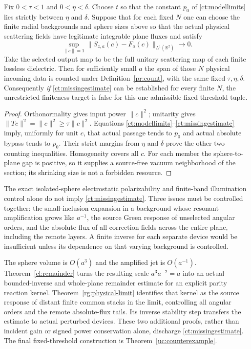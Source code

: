 \begin{proposition}
\label{ct:completion}
Fix $0<\tau<1$ and $0<\eta<\delta$. Choose $t$ so that the constant
$p_0$ of \eqref{ct:modellimits} lies strictly between $\eta$ and
$\delta$. Suppose that for each fixed $N$ one can choose the finite
radial backgrounds and sphere sizes above so that the actual
physical scattering fields have legitimate integrable plane fluxes
and satisfy
\begin{equation}\label{ct:missingestimate}
 \sup_{\|c\|=1}
 \|S_{z,a}(c)-F_a(c)\|_{L^1(\mathbb R^2)}\longrightarrow0.
\end{equation}
Take the selected output map to be the full unitary scattering map
of each finite lossless dielectric. Then for sufficiently small $a$
the span of those $N$ physical incoming data is counted under
Definition~\ref{pr:count}, with the same fixed $\tau,\eta,\delta$.
Consequently \emph{if} \eqref{ct:missingestimate} can be established
for every finite $N$, the unrestricted finiteness target is false
for this one admissible fixed threshold tuple.
\end{proposition}
\begin{proof}
Orthonormality gives input power $\|c\|^2$; unitarity gives
$\|Tc\|^2=\|c\|^2\geq\tau\|c\|^2$.
Equations \eqref{ct:modellimits}--\eqref{ct:missingestimate} imply,
uniformly for unit $c$, that actual passage tends to $p_0$ and
actual absolute bypass tends to $p_0$. Their strict margins from
$\eta$ and $\delta$ prove the other two counting inequalities.
Homogeneity covers all $c$. For each member the sphere-to-plane
gap is positive, so it supplies a source-free vacuum neighborhood
of the section; its shrinking size is not a forbidden resource.
\end{proof}

\begin{remark}
\label{ct:gap}
The exact isolated-sphere electrostatic polarizability and finite-band
illumination control alone do not imply \eqref{ct:missingestimate}.
Three issues must be controlled together:
the small-inclusion expansion in a background whose resonant
amplification grows like $a^{-1}$, the source Green response of
unselected angular orders, and the absolute flux of all correction
fields across the entire plane, including the remote layers.
A finite inverse for each separate device would be insufficient unless
its dependence on that varying background is controlled.

The sphere volume is $O(a^3)$ and the amplified jet is $O(a^{-1})$.
Theorem~\ref{cl:remainder} turns the resulting scale
$a^3a^{-2}=a$ into an actual bounded-inverse and whole-plane remainder
estimate for an explicit parity reaction kernel.
Theorem~\ref{rg:physical-limit} identifies that kernel as the source
response of distant finite common stacks in the limit, controlling
all angular orders and the remote absolute-flux tails. Its inverse
stability step transfers the estimate to actual perturbed devices.
These two additional proofs, rather than incident gain or signed
power conservation alone, discharge \eqref{ct:missingestimate}.
The final fixed-threshold construction is Theorem~\ref{uc:counterexample}.
\end{remark}
